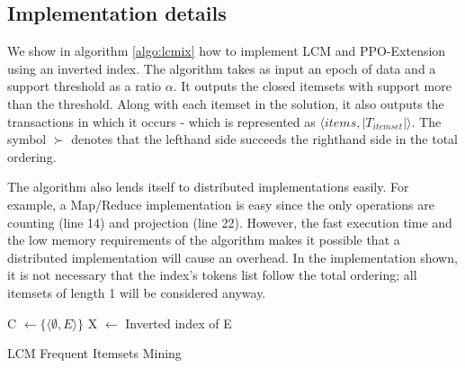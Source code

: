 \documentclass{sig-alternate}
\begin{document}
\subsection{Implementation details}
We show in algorithm \ref{algo:lcmix} how to implement LCM and PPO-Extension using an inverted index. The algorithm takes as input an epoch of data and a support threshold as a ratio $\alpha$. It outputs the closed itemsets with support more than the threshold. Along with each itemset in the solution, it also outputs the transactions in which it occurs - which is represented as $\langle items, |T_{itemset}| \rangle$. The symbol $\succ$ denotes that the lefthand side  succeeds the righthand side in the total ordering.

The algorithm also lends itself to distributed implementations easily. For example, a Map/Reduce implementation is easy since the only operations are counting (line 14) and projection (line 22). However, the fast execution time and the low memory requirements of the algorithm makes it possible that a distributed implementation will cause an overhead. In the implementation shown, it is not necessary that the index's tokens list follow the total ordering; all itemsets of length 1 will be considered anyway. 

\begin{algorithm}
\SetAlgoLined
\LinesNumbered
{}

C $\gets \{\langle \emptyset, E\rangle\}$ 
X $\gets$ Inverted index of E\;
\;


\caption{LCM Frequent Itemsets Mining}
\label{algo:lcmix}
\end{algorithm}
\end{document}
